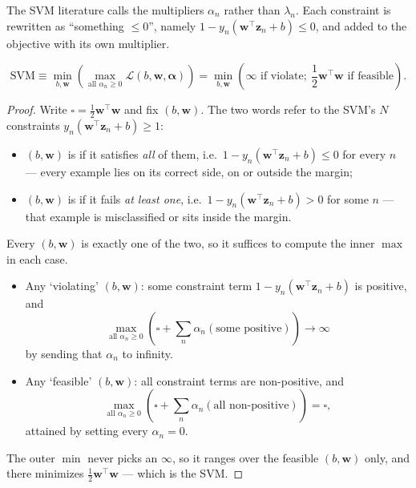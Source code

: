 The SVM literature calls the multipliers \(\alpha_n\) rather than
\(\lambda_n\). Each constraint is rewritten as ``something \(\le 0\)'',
namely \(1 - y_n(\bm{w}^\top \bm{z}_n + b) \le 0\), and added to the objective
with its own multiplier.

\begin{lemma}[Claim]\label{lem:svm-minmax}
    \[
        \text{SVM} \equiv \min_{b, \bm{w}} \left( \max_{\text{all } \alpha_n
        \ge 0} \mathcal{L}(b, \bm{w}, \bm{\alpha}) \right)
        = \min_{b, \bm{w}} \left( \infty \text{ if violate};\
        \frac{1}{2} \bm{w}^\top \bm{w} \text{ if feasible} \right).
    \]
\end{lemma}

\begin{proof}
    Write \(\square = \frac{1}{2} \bm{w}^\top \bm{w}\) and fix \((b,
    \bm{w})\). The two words refer to the SVM's \(N\) constraints
    \(y_n (\bm{w}^\top \bm{z}_n + b) \ge 1\):
    \begin{itemize}
        \item \((b, \bm{w})\) is  if it satisfies \emph{all}
            of them, i.e.\ \(1 - y_n (\bm{w}^\top \bm{z}_n + b) \le 0\) for
            every \(n\) --- every example lies on its correct side, on or
            outside the margin;
        \item \((b, \bm{w})\) is  if it fails \emph{at least
            one}, i.e.\ \(1 - y_n (\bm{w}^\top \bm{z}_n + b) > 0\) for some
            \(n\) --- that example is misclassified or sits inside the margin.
    \end{itemize}
    Every \((b, \bm{w})\) is exactly one of the two, so it suffices to compute
    the inner \(\max\) in each case.
    \begin{itemize}
        \item Any `violating' \((b, \bm{w})\): some constraint term \(1 - y_n
            (\bm{w}^\top \bm{z}_n + b)\) is positive, and
            \[
                \max_{\text{all } \alpha_n \ge 0} \left( \square + \sum_n
                \alpha_n (\text{some positive}) \right) \to \infty
            \]
            by sending that \(\alpha_n\) to infinity.
        \item Any `feasible' \((b, \bm{w})\): all constraint terms are
            non-positive, and
            \[
                \max_{\text{all } \alpha_n \ge 0} \left( \square + \sum_n
                \alpha_n (\text{all non-positive}) \right) = \square,
            \]
            attained by setting every \(\alpha_n = 0\).
    \end{itemize}
    The outer \(\min\) never picks an \(\infty\), so it ranges over the
    feasible \((b, \bm{w})\) only, and there minimizes \(\frac{1}{2}
    \bm{w}^\top \bm{w}\) --- which is the SVM.
\end{proof}

